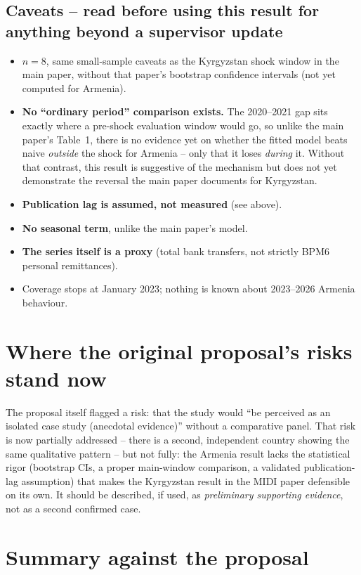 \documentclass[11pt]{article}
\begin{document}
\subsection*{Caveats -- read before using this result for anything beyond a supervisor update}
\begin{itemize}
\item \textbf{$n=8$}, same small-sample caveats as the Kyrgyzstan shock window in the main paper,
  without that paper's bootstrap confidence intervals (not yet computed for Armenia).
\item \textbf{No ``ordinary period'' comparison exists.} The 2020--2021 gap sits exactly where a
  pre-shock evaluation window would go, so unlike the main paper's Table~1, there is no evidence
  yet on whether the fitted model beats naive \emph{outside} the shock for Armenia -- only that
  it loses \emph{during} it. Without that contrast, this result is suggestive of the mechanism
  but does not yet demonstrate the reversal the main paper documents for Kyrgyzstan.
\item \textbf{Publication lag is assumed, not measured} (see above).
\item \textbf{No seasonal term}, unlike the main paper's model.
\item \textbf{The series itself is a proxy} (total bank transfers, not strictly BPM6 personal
  remittances).
\item Coverage stops at January 2023; nothing is known about 2023--2026 Armenia behaviour.
\end{itemize}

\section{Where the original proposal's risks stand now}

The proposal itself flagged a risk: that the study would ``be perceived as an isolated case
study (anecdotal evidence)'' without a comparative panel. That risk is now partially addressed
-- there is a second, independent country showing the same qualitative pattern -- but not fully:
the Armenia result lacks the statistical rigor (bootstrap CIs, a proper main-window comparison,
a validated publication-lag assumption) that makes the Kyrgyzstan result in the MIDI paper
defensible on its own. It should be described, if used, as \emph{preliminary supporting
evidence}, not as a second confirmed case.

\section{Summary against the proposal}
\end{document}
